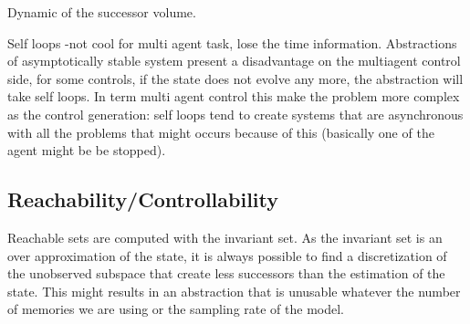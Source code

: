 Dynamic of the successor volume.

Self loops -not cool for multi agent task, lose the time information.
Abstractions of asymptotically stable system present a disadvantage on the multiagent control side, for some controls, if the state does not evolve any more, the abstraction will take self loops.
In term multi agent control this make the problem more complex as the control generation: self loops tend to create systems that are asynchronous with all the problems that might occurs because of this (basically one of the agent might be be stopped).





\subsection{Reachability/Controllability}
Reachable sets are computed with the invariant set. As the invariant set is an over approximation of the state, it is always possible to find a discretization of the unobserved subspace that create less successors than the estimation of the state.
This might results in an abstraction that is unusable whatever the number of memories we are using or the sampling rate of the model.

%
%
